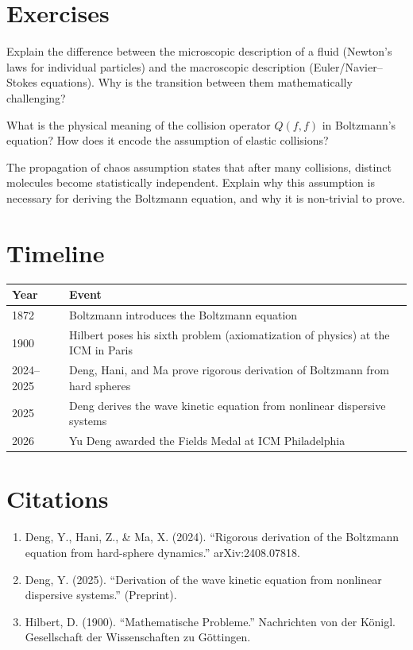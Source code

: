 \section{Exercises}

\begin{exercise}[Basic]
Explain the difference between the microscopic description of a fluid (Newton's laws for individual particles) and the macroscopic description (Euler/Navier--Stokes equations). Why is the transition between them mathematically challenging?
\end{exercise}

\begin{exercise}[Intermediate]
What is the physical meaning of the collision operator $Q(f,f)$ in Boltzmann's equation? How does it encode the assumption of elastic collisions?
\end{exercise}

\begin{exercise}[Challenge]
The propagation of chaos assumption states that after many collisions, distinct molecules become statistically independent. Explain why this assumption is necessary for deriving the Boltzmann equation, and why it is non-trivial to prove.
\end{exercise}

\section{Timeline}

\begin{tabularx}{\linewidth}{lX}
\toprule
\textbf{Year} & \textbf{Event} \\ \midrule
1872 & Boltzmann introduces the Boltzmann equation \\
1900 & Hilbert poses his sixth problem (axiomatization of physics) at the ICM in Paris \\
2024--2025 & Deng, Hani, and Ma prove rigorous derivation of Boltzmann from hard spheres \\
2025 & Deng derives the wave kinetic equation from nonlinear dispersive systems \\
2026 & Yu Deng awarded the Fields Medal at ICM Philadelphia \\
\bottomrule
\end{tabularx}

\section{Citations}

\begin{enumerate}
\item Deng, Y., Hani, Z., \& Ma, X. (2024). ``Rigorous derivation of the Boltzmann equation from hard-sphere dynamics.'' arXiv:2408.07818.
\item Deng, Y. (2025). ``Derivation of the wave kinetic equation from nonlinear dispersive systems.'' (Preprint).
\item Hilbert, D. (1900). ``Mathematische Probleme.'' Nachrichten von der K\"onigl. Gesellschaft der Wissenschaften zu G\"ottingen.
\end{enumerate}
